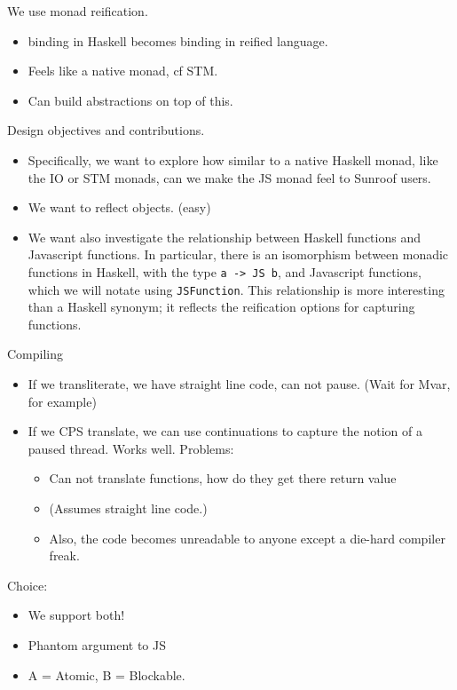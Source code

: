 \documentclass{llncs}
\begin{document}
We use monad reification.
\begin{itemize}
\item binding in Haskell becomes binding in reified language.
\item Feels like a native monad, cf STM.
\item Can build abstractions on top of this.
\end{itemize}

Design objectives and contributions.
\begin{itemize}
\item 
Specifically, we want to explore how similar to a native Haskell monad,
like the IO or STM monads, can we make the JS monad feel to Sunroof users.
\item We want to reflect objects. (easy)

\item We want also investigate the relationship between Haskell functions
and Javascript functions. In particular, there is an isomorphism
between monadic functions in Haskell, with the type \verb|a -> JS b|,
and Javascript functions, which we will notate using \verb|JSFunction|.
This relationship is more interesting than a Haskell synonym;
it reflects the reification options for capturing functions.
\end{itemize}

 
Compiling
\begin{itemize}
\item If we transliterate, we have straight line code, can not pause.
    (Wait for Mvar, for example)
\item If we CPS translate, we can use continuations to capture the
   notion of a paused thread. Works well.
   Problems:
  \begin{itemize}
   \item Can not translate functions, how do they get there return value
   \item (Assumes straight line code.)
   \item Also, the code becomes unreadable to anyone except a die-hard 
       compiler freak.
  \end{itemize}
\end{itemize}
 
Choice:
\begin{itemize}
\item We support both!
\item Phantom argument to JS
\item A = Atomic, B = Blockable.
\end{itemize}
\end{document}
